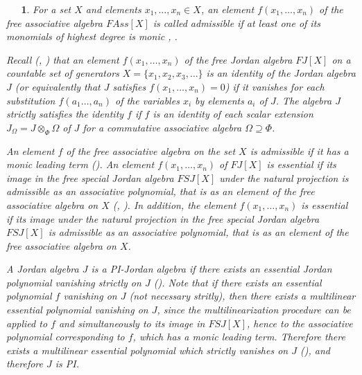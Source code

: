 \documentclass[a4paper,twoside,11pt]{article}
\theoremstyle{plain}
\theoremstyle{miestilo}
\theoremstyle{misnotas}
\newtheorem{apartado}[subsection]{\ {\ }}
\begin{document}
\begin{apartado}For a set $X$ and elements $x_1,\dots,x_n\in X$, an element $f(x_1,\dots,x_n)$ of the free associative algebra $FAss[X]$ is called admissible if at least one of its monomials of highest degree is monic \cite[p. 109]{zsss}, \cite{zazd}.




Recall (\cite[Chapter 3]{jac-struc}, \cite[IV.B]{taste}) that an element $f(x_1,\dots,x_n)$ of the free Jordan algebra $FJ[X] $ on a countable set of generators $X=\{x_1,x_2,x_3,\dots\}$ is an identity of the Jordan algebra $J$ (or equivalently that $J$ satisfies $f(x_1,\dots,x_n)=0$) if it vanishes for each substitution $f(a_1\dots,a_n)$ of the variables $x_i$ by elements $a_i$ of $J$. The algebra $J$ strictly satisfies the identity $f$ if $f$ is an identity of each scalar extension $J_\Omega = J\otimes_\Phi\Omega$ of $J$ for a commutative associative algebra $\Omega \supseteq \Phi$.

An element $f$ of the free associative algebra on the set $X$ is admissible if it has a monic leading term (\cite[p. 102]{zsss}). An element $f(x_1,\dots,x_n)$ of  $FJ[X] $ is essential if its image in the free special Jordan algebra $FSJ[X]$ under the natural projection is admissible as an associative polynomial, that is as an element of the free associative algebra on $X$ (\cite[p. 112]{zsss}, \cite{zazd}). In addition, the element $f(x_1,\dots,x_n)$ is essential if its image under the natural projection in the free special Jordan algebra $FSJ[X]$ is admissible as an associative polynomial, that is as an element of the free associative algebra on $X$.


A Jordan algebra $J$ is a PI-Jordan algebra if there exists an essential Jordan polynomial vanishing strictly on $J$ (\cite{mcz}). Note that if there exists an essential polynomial $f$ vanishing on $J$ (not necessary stritly), then there exists a multilinear essential polynomial vanishing on $J$, since the multilinearization procedure \cite[p.14]{zsss} can be applied to $f$ and simultaneously to its image in $FSJ[X]$, hence to the associative polynomial corresponding to $f$, which has a monic leading term. Therefore there exists a multilinear essential polynomial which strictly vanishes on $J$ (\cite[1.5]{zsss}), and therefore $J$ is PI.

\end{apartado}
\end{document}
